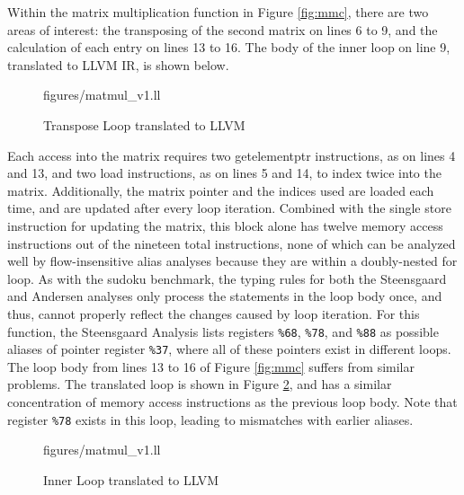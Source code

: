 Within the matrix multiplication function in Figure \ref{fig:mmc}, there are two areas of interest: the transposing of the second matrix on lines 6 to 9, and the calculation of each entry on lines 13 to 16. The body of the inner loop on line 9, translated to LLVM IR, is shown below.

\begin{figure} [h!]
   {figures/matmul_v1.ll}
  \caption{Transpose Loop translated to LLVM}
  \label{fig:mmll}
\end{figure}

Each access into the matrix requires two getelementptr instructions, as on lines 4 and 13, and two load instructions, as on lines 5 and 14, to index twice into the matrix. Additionally, the matrix pointer and the indices used are loaded each time, and are updated after every loop iteration. Combined with the single store instruction for updating the matrix, this block alone has twelve memory access instructions out of the nineteen total instructions, none of which can be analyzed well by flow-insensitive alias analyses because they are within a doubly-nested for loop. As with the sudoku benchmark, the typing rules for both the Steensgaard and Andersen analyses only process the statements in the loop body once, and thus, cannot properly reflect the changes caused by loop iteration. For this function, the Steensgaard Analysis lists registers \texttt{\%68}, \texttt{\%78}, and \texttt{\%88} as possible aliases of pointer register \texttt{\%37}, where all of these pointers exist in different loops. The loop body from lines 13 to 16 of Figure \ref{fig:mmc} suffers from similar problems. The translated loop is shown in Figure \ref{fig:mmll2}, and has a similar concentration of memory access instructions as the previous loop body. Note that register \texttt{\%78} exists in this loop, leading to mismatches with earlier aliases.

\begin{figure} [h!]
   {figures/matmul_v1.ll}
  \caption{Inner Loop translated to LLVM}
  \label{fig:mmll2}
\end{figure}

